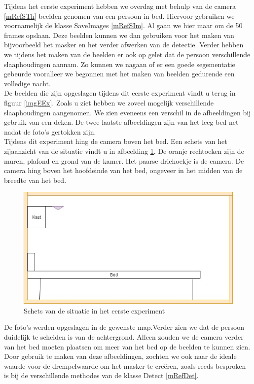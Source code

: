Tijdens het eerste experiment hebben we overdag met behulp van de camera \ref{mRefSTh} beelden genomen van een persoon in bed. Hiervoor gebruiken we voornamelijk de klasse SaveImages \ref{mRefSIm}. Al gaan we hier maar om de 50 frames opslaan. Deze beelden kunnen we dan gebruiken voor het maken van bijvoorbeeld het masker en het verder afwerken van de detectie. Verder hebben we tijdens het maken van de beelden er ook op gelet dat de persoon verschillende slaaphoudingen aannam. Zo kunnen we nagaan of er een goede segementatie gebeurde vooralleer we begonnen met het maken van beelden gedurende een volledige nacht.\\
De beelden die zijn opgeslagen tijdens dit eerste experiment vindt u terug in figuur \ref{imgEEx}. Zoals u ziet hebben we zoveel mogelijk verschillende slaaphoudingen aangenomen. We zien eveneens een verschil in de afbeeldingen bij gebruik van een deken. De twee laatste afbeeldingen zijn van het leeg bed net nadat de foto's gertokken zijn. \\
Tijdens dit experiment hing de camera boven het bed. Een schets van het zijaanzicht van de situatie vindt u in afbeelding \ref{imgEEx2}. De oranje rechtoeken zijn de muren, plafond en grond van de kamer. Het paarse driehoekje is de camera. De camera hing boven het hoofdeinde van het bed, ongeveer in het midden van de breedte van het bed. \\
\begin{figure}[h]
	\includegraphics[scale=0.5]{SchetsExperiment1}
	\caption{Schets van de situatie in het eerste experiment}
	\label{imgEEx2}
\end{figure}
De foto's werden opgeslagen in de gewenste map.Verder zien we dat de persoon duidelijk te scheiden is van de achtergrond. Alleen zouden we de camera verder van het bed moeten plaatsen om meer van het bed op de beelden te kunnen zien. Door gebruik te maken van deze afbeeldingen, zochten we ook naar de ideale waarde voor de drempelwaarde om het masker te cre\"eren, zoals reeds besproken is bij de verschillende methodes van de klasse Detect \ref{mRefDet}.

